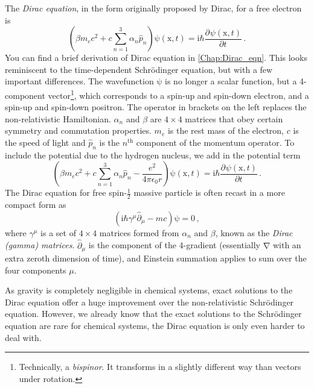 \documentclass{article}
\theoremstyle{plain}\theoremheaderfont{\normalfont\itshape}\theorembodyfont{\rmfamily}\theoremseparator{.}\newtheorem*{rem}{Remark}\newtheorem*{ex}{Example}\newtheorem*{proof}{Proof}\newtheorem*{altp}{Alternative proof}
\theoremstyle{plain}\theoremheaderfont{\normalfont\bfseries}\theorembodyfont{\rmfamily}\theoremseparator{.}\newtheorem{thm}{Theorem}[section]\newtheorem{lem}[thm]{Lemma}\newtheorem{prop}[thm]{Proposition}\newtheorem*{cor}{Corollary}\newtheorem{defn}[thm]{Definition}\newtheorem{clm}[thm]{Claim}\newtheorem{clminproof}{Claim}
\theoremstyle{break}\theoremheaderfont{\normalfont\itshape}\theorembodyfont{\rmfamily}\theoremseparator{.\medskip}\newtheorem*{proofskip}{Proof}\newtheorem*{exs}{Examples}\newtheorem*{rems}{Remarks}
\theoremstyle{break}\theoremheaderfont{\normalfont\bfseries}\theorembodyfont{\rmfamily}\theoremseparator{.\medskip}\newtheorem{lemskip}[thm]{Lemma}\newtheorem{defnskip}[thm]{Definition}\newtheorem{propskip}[thm]{Proposition}\newtheorem{thmskip}[thm]{Theorem}
\numberwithin{equation}{section}
\newcommand{\ii}{\mathrm{i}}
\newcommand{\pdv}[3][]{\frac{\partial^{#1} #2}{{\partial #3}^{#1}}}
\newcommand{\vb}[1]{\bm{\mathrm{#1}}}
\newcommand{\grad}{\vb{\nabla}}
\begin{document}
    The \textit{Dirac equation}, in the form originally proposed by Dirac, for a free electron is
    \begin{equation}
        \left(\beta m_e c^2 + c\sum_{n=1}^{3}\alpha_n\hat{p}_n\right)\vb{\psi}(\vb{x},t)=\ii\hbar\pdv{\psi(\vb{x},t)}{t}\,.
    \end{equation}
    You can find a brief derivation of Dirac equation in \cref{Chap:Dirac_eqn}. This looks reminiscent to the time-dependent Schr\"{o}dinger equation, but with a few important differences. The wavefunction \(\vb{\psi}\) is no longer a scalar function, but a 4-component vector\footnote{Technically, a \textit{bispinor}. It transforms in a slightly different way than vectors under rotation.}, which corresponds to a spin-up and spin-down electron, and a spin-up and spin-down positron. The operator in brackets on the left replaces the non-relativistic Hamiltonian. \(\alpha_n\) and \(\beta\) are \(4\times 4\) matrices that obey certain symmetry and commutation properties. \(m_e\) is the rest mass of the electron, \(c\) is the speed of light and \(\hat{p}_n\) is the \(n^{\text{th}}\) component of the momentum operator. To include the potential due to the hydrogen nucleus, we add in the potential term
    \begin{equation}
        \left(\beta m_e c^2 + c\sum_{n=1}^{3}\alpha_n\hat{p}_n-\frac{e^2}{4\pi\epsilon_0 r}\right)\vb{\psi}(\vb{x},t)=\ii\hbar\pdv{\psi(\vb{x},t)}{t}\,.
    \end{equation}
    The Dirac equation for free spin-\(\frac{1}{2}\) massive particle is often recast in a more compact form as
    \begin{equation}
        \left(\ii\hbar\gamma^\mu\hat{\partial}_\mu-mc\right)\vb{\psi}=\vb{0}\,,
    \end{equation}
    where \(\gamma^\mu\) is a set of \(4\times 4\) matrices formed from \(\alpha_n\) and \(\beta\), known as the \textit{Dirac (gamma) matrices}. \(\hat{\partial}_{\mu}\) is the component of the 4-gradient (essentially \(\grad\) with an extra zeroth dimension of time), and Einstein summation applies to sum over the four components \(\mu\).

    As gravity is completely negligible in chemical systems, exact solutions to the Dirac equation offer a huge improvement over the non-relativistic Schr\"{o}dinger equation. However, we already know that the exact solutions to the Schr\"{o}dinger equation are rare for chemical systems, the Dirac equation is only even harder to deal with.
\end{document}
